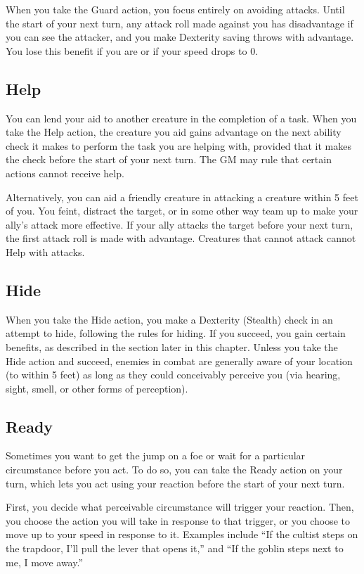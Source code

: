 When you take the Guard action, you focus entirely on avoiding attacks. Until the start of your next turn, any attack roll made against you has disadvantage if you can see the attacker, and you make Dexterity saving throws with advantage. You lose this benefit if you are  or if your speed drops to 0.

\subsection{Help}

You can lend your aid to another creature in the completion of a task. When you take the Help action, the creature you aid gains advantage on the next ability check it makes to perform the task you are helping with, provided that it makes the check before the start of your next turn. The GM may rule that certain actions cannot receive help.

Alternatively, you can aid a friendly creature in attacking a creature within 5 feet of you. You feint, distract the target, or in some other way team up to make your ally's attack more effective. If your ally attacks the target before your next turn, the first attack roll is made with advantage. Creatures that cannot attack cannot Help with attacks.

\subsection{Hide}

When you take the Hide action, you make a Dexterity (Stealth) check in an attempt to hide, following the rules for hiding. If you succeed, you gain certain benefits, as described in the  section later in this chapter. Unless you take the Hide action and succeed, enemies in combat are generally aware of your location (to within 5 feet) as long as they could conceivably perceive you (via hearing, sight, smell, or other forms of perception).

\subsection{Ready}

Sometimes you want to get the jump on a foe or wait for a particular circumstance before you act. To do so, you can take the Ready action on your turn, which lets you act using your reaction before the start of your next turn.

First, you decide what perceivable circumstance will trigger your reaction. Then, you choose the action you will take in response to that trigger, or you choose to move up to your speed in response to it. Examples include “If the cultist steps on the trapdoor, I'll pull the lever that opens it,” and “If the goblin steps next to me, I move away.”


